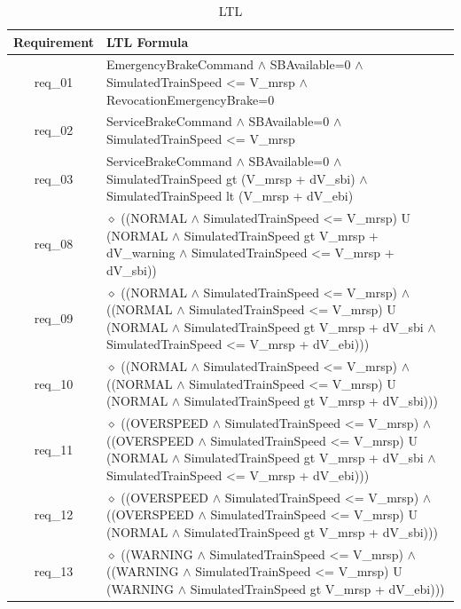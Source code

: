 \begin{table}[ht!]
\footnotesize
	\caption{LTL}
	\begin{center}
    \begin{tabular}{|c|p{10cm}|}
    \hline
	Requirement & LTL Formula \\
	\hline
	\hline
	req\_01 & EmergencyBrakeCommand $\wedge$ SBAvailable=0 $\wedge$ SimulatedTrainSpeed <= V\_mrsp $\wedge$  RevocationEmergencyBrake=0\\
	\hline
	req\_02 & ServiceBrakeCommand $\wedge$ SBAvailable=0 $\wedge$ SimulatedTrainSpeed <= V\_mrsp\\
	\hline
	req\_03 & ServiceBrakeCommand $\wedge$ SBAvailable=0 $\wedge$ SimulatedTrainSpeed gt (V\_mrsp + dV\_sbi) $\wedge$ SimulatedTrainSpeed lt (V\_mrsp + dV\_ebi) \\
	\hline
	req\_08 &  $\diamond$ ((NORMAL	 $\wedge$ SimulatedTrainSpeed <= V\_mrsp) U (NORMAL $\wedge$ SimulatedTrainSpeed gt V\_mrsp + dV\_warning $\wedge$ SimulatedTrainSpeed <= V\_mrsp + dV\_sbi)) \\
	\hline
	req\_09 & $\diamond$ ((NORMAL $\wedge$ SimulatedTrainSpeed <= V\_mrsp) $\wedge$ ((NORMAL $\wedge$ SimulatedTrainSpeed <= V\_mrsp) U (NORMAL $\wedge$ SimulatedTrainSpeed gt V\_mrsp + dV\_sbi $\wedge$ SimulatedTrainSpeed <= V\_mrsp + dV\_ebi))) \\
	\hline
	req\_10 & $\diamond$ ((NORMAL $\wedge$ SimulatedTrainSpeed <= V\_mrsp) $\wedge$ ((NORMAL $\wedge$ SimulatedTrainSpeed <= V\_mrsp) U (NORMAL $\wedge$ SimulatedTrainSpeed gt V\_mrsp + dV\_sbi)))\\
	\hline
	req\_11 & $\diamond$ ((OVERSPEED $\wedge$ SimulatedTrainSpeed <= V\_mrsp) $\wedge$ ((OVERSPEED $\wedge$ SimulatedTrainSpeed <= V\_mrsp) U (NORMAL $\wedge$ SimulatedTrainSpeed gt V\_mrsp + dV\_sbi $\wedge$ SimulatedTrainSpeed <= V\_mrsp + dV\_ebi))) \\
	\hline
	req\_12 & $\diamond$ ((OVERSPEED $\wedge$ SimulatedTrainSpeed <= V\_mrsp) $\wedge$ ((OVERSPEED $\wedge$ SimulatedTrainSpeed <= V\_mrsp) U (NORMAL $\wedge$ SimulatedTrainSpeed gt V\_mrsp + dV\_sbi))) \\
	\hline
	req\_13 & $\diamond$ ((WARNING $\wedge$ SimulatedTrainSpeed <= V\_mrsp) $\wedge$ ((WARNING $\wedge$ SimulatedTrainSpeed <= V\_mrsp) U (WARNING $\wedge$ SimulatedTrainSpeed gt V\_mrsp + dV\_ebi))) \\
	\hline
    \end{tabular}
    \end{center}
\label{tab:reqltl}
\end{table} 

